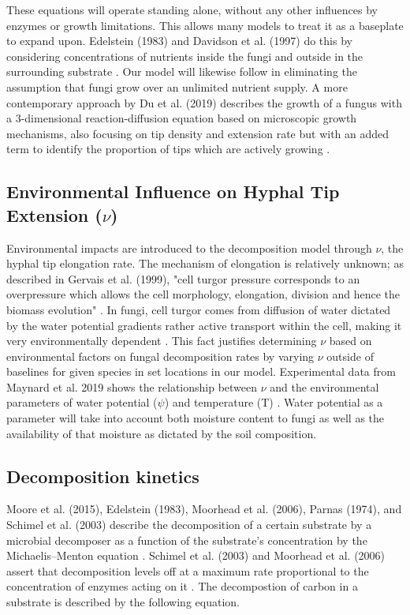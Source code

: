 \documentclass[12pt]{article}
\begin{document}
\begin{multicols}{2}
These equations will operate standing alone, without any other influences by enzymes or growth limitations. This allows many models to treat it as a baseplate to expand upon. Edelstein (1983) and Davidson et al. (1997) do this by considering concentrations of nutrients inside the fungi and outside in the surrounding substrate \cite{Edelstein1983, Davidson2012}. Our model will likewise follow in eliminating the assumption that fungi grow over an unlimited nutrient supply. A more contemporary approach by Du et al. (2019) describes the growth of a fungus with a 3-dimensional reaction-diffusion equation based on microscopic growth mechanisms, also focusing on tip density and extension rate but with an added term to identify the proportion of tips which are actively growing \cite{Du2019}.

\subsection{Environmental Influence on Hyphal Tip Extension ($\nu$)}
Environmental impacts are introduced to the decomposition model through $\nu$, the hyphal tip elongation rate. The mechanism of elongation is relatively unknown; as described in Gervais et al. (1999), "cell turgor pressure corresponds to an overpressure which allows the cell morphology, elongation, division and hence the biomass evolution" \cite{Gervais1999, Steinberg2007}. In fungi, cell turgor comes from diffusion of water dictated by the water potential gradients rather active transport within the cell, making it very environmentally dependent \cite{Gervais1999}. This fact justifies determining $\nu$ based on environmental factors on fungal decomposition rates by varying $\nu$ outside of baselines for given species in set locations in our model. Experimental data from Maynard et al. 2019 shows the relationship between $\nu$ and the environmental parameters of water potential ($\psi$) and temperature (T) \cite{Maynard2019}.  Water potential as a parameter will take into account both moisture content to fungi as well as the availability of that moisture as dictated by the  soil composition.

\subsection{Decomposition kinetics}
Moore et al. (2015), Edelstein (1983), Moorhead et al. (2006), Parnas (1974), and Schimel et al. (2003) describe the decomposition of a certain substrate by a microbial decomposer as a function of the substrate's concentration by the Michaelis–Menton equation \cite{Moore2015, Edelstein1983, Moorhead2006, Parnas1975, Schimel2003}. Schimel et al. (2003) and Moorhead et al. (2006) assert that decomposition levels off at a maximum rate proportional to the concentration of enzymes acting on it \cite{Schimel2003, Moorhead2006}. The decompostion of carbon in a substrate is described by the following equation.


\end{multicols}
\end{document}
